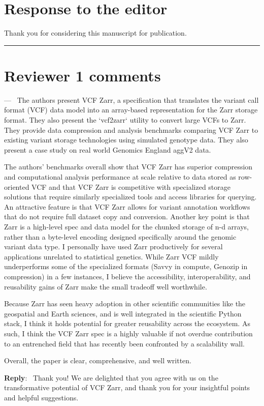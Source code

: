 \documentclass[11pt]{article}
\newcounter{reviewer}
\newcounter{point}[reviewer]
\renewcommand{\thepoint}{\thereviewer.\arabic{point}}
\newcommand{\reviewersection}{\stepcounter{reviewer} \bigskip \hrule}
\newenvironment{point}
   {\refstepcounter{point} \bigskip \noindent {\textbf{Point~\thepoint} } ---\ }
   {\par }
\newenvironment{reply}
   {\medskip \noindent \begin{sf}\textbf{Reply}:\  }
   {\medskip \end{sf}}
\begin{document}
\section*{Response to the editor}
Thank you for considering this manuscript for publication.  

\reviewersection
\section*{Reviewer 1 comments}

\begin{point}
The authors present VCF Zarr, a specification that translates the variant call
format (VCF) data model into an array-based representation for the Zarr storage
format. They also present the `vcf2zarr` utility to convert large VCFs to Zarr.
They provide data compression and analysis benchmarks comparing VCF Zarr to
existing variant storage technologies using simulated genotype data. They also
present a case study on real world Genomics England aggV2 data.

The authors' benchmarks overall show that VCF Zarr has superior compression and
computational analysis performance at scale relative to data stored as
row-oriented VCF and that VCF Zarr is competitive with specialized storage
solutions that require similarly specialized tools and access libraries for
querying. An attractive feature is that VCF Zarr allows for variant annotation
workflows that do not require full dataset copy and conversion. Another key
point is that Zarr is a high-level spec and data model for the chunked storage
of n-d arrays, rather than a byte-level encoding designed specifically around
the genomic variant data type. I personally have used Zarr productively for
several applications unrelated to statistical genetics. While Zarr VCF mildly
underperforms some of the specialized formats (Savvy in compute, Genozip in
compression) in a few instances, I believe the accessibility, interoperability,
and reusability gains of Zarr make the small tradeoff well worthwhile. 

Because Zarr has seen heavy adoption in other scientific communities like the
geospatial and Earth sciences, and is well integrated in the scientific Python
stack, I think it holds potential for greater reusability across the ecosystem.
As such, I think the VCF Zarr spec is a highly valuable if not overdue
contribution to an entrenched field that has recently been confronted by a
scalability wall.

Overall, the paper is clear, comprehensive, and well written. 
\end{point}
\begin{reply}
Thank you!  We are delighted that you agree with us on the transformative
potential of VCF Zarr, and thank you for your insightful points and
helpful suggestions.
\end{reply}
\end{document}
